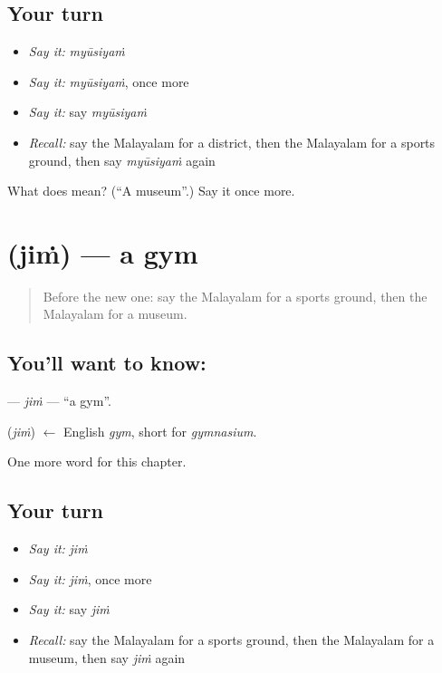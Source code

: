 \subsection*{Your turn}
\begin{itemize}
\raggedright
  \item \emph{Say it:} \emph{myūsiyaṁ}
  \item \emph{Say it:} \emph{myūsiyaṁ}, once more
  \item \emph{Say it:} say \emph{myūsiyaṁ}
  \item \emph{Recall:} say the Malayalam for a district, then the Malayalam for a sports ground, then say \emph{myūsiyaṁ} again
\end{itemize}

\begin{tcolorbox}[breakable,colback=teal!4,colframe=teal!35!black,title={Before you move on}]
What does  mean? (\textquotedblleft{}A museum\textquotedblright{}.) Say it once more.
\end{tcolorbox}
\section[\texorpdfstring{\ml{ജിം} (jiṁ)}{ജിം (jiṁ)}]{ (jiṁ) — a gym}

\label{lesson:ML-C279-jim}



\begin{quote}
Before the new one: say the Malayalam for a sports ground, then the Malayalam for a museum.
\end{quote}

\subsection*{You'll want to know: }
\textbf{} — \emph{jiṁ} — \textquotedblleft{}a gym\textquotedblright{}.

\begin{cousinweb}
\textbf{} (\emph{jiṁ}) $\leftarrow$ English \emph{gym}, short for \emph{gymnasium}.
\end{cousinweb}

\begin{grammarlens}[title={What you've built}]
One more word for this chapter.
\end{grammarlens}

\subsection*{Your turn}
\begin{itemize}
\raggedright
  \item \emph{Say it:} \emph{jiṁ}
  \item \emph{Say it:} \emph{jiṁ}, once more
  \item \emph{Say it:} say \emph{jiṁ}
  \item \emph{Recall:} say the Malayalam for a sports ground, then the Malayalam for a museum, then say \emph{jiṁ} again
\end{itemize}

